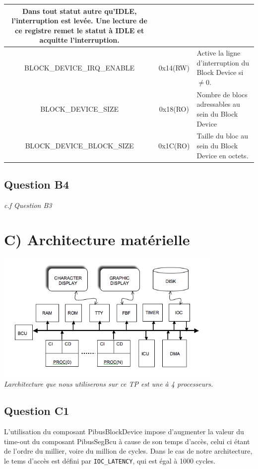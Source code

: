 \documentclass[10pt]{article}
\begin{document}
\begin{tabular}{|c|c|p{9cm}|}
                                     Dans tout statut autre qu'IDLE,
                                     l'interruption est levée. Une lecture de
                                     ce registre remet le statut à IDLE et
                                     acquitte l'interruption. \\ \hline
  BLOCK\_DEVICE\_IRQ\_ENABLE & 0x14(RW) & Active la ligne d'interruption du
                                          Block Device si $\neq0$. \\ \hline
  BLOCK\_DEVICE\_SIZE & 0x18(RO) & Nombre de blocs adressables au sein du Block
                                   Device \\ \hline
  BLOCK\_DEVICE\_BLOCK\_SIZE & 0x1C(RO) & Taille du bloc au sein du Block Device
                                          en octets. \\ \hline
\end{tabular}

\subsection{Question B4}
{\it c.f Question B3}

\section{C) Architecture matérielle}
\begin{center}
  \includegraphics[width=11cm]{./tp8_topcell.png}\\[1ex]
  {\it Larchitecture que nous utiliserons sur ce TP est une à 4 processeurs.}
\end{center}

\subsection{Question C1}
L'utilisation du composant PibusBlockDevice impose d'augmenter la valeur du
time-out du composant PibusSegBcu à cause de son temps d'accès, celui ci étant
de l'ordre du millier, voire du million de cycles. Dans le cas de notre
architecture, le tems d'accès est défini par \texttt{IOC\_LATENCY}, qui est égal
à 1000 cycles.
\end{document}
